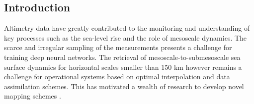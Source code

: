 \begin{bibunit}[IEEEtran.bst]



\section{Introduction}


  Altimetry data have greatly contributed to the monitoring and understanding of key processes such as the sea-level rise and the role of mesoscale dynamics.
    The scarce and irregular sampling of the measurements presents a challenge for training deep neural networks.
  The retrieval of mesoscale-to-submesoscale sea surface dynamics for horizontal scales smaller than 150 km however remains a challenge for operational systems based on optimal interpolation \cite{taburetDUACSDT2018252019} and data assimilation \cite{jean-michelCopernicusGlobal122021} schemes. This has motivated a wealth of research to develop novel mapping schemes \cite{ballarottaDynamicMappingAlongTrack2020,ubelmannReconstructingOceanSurface2021,guillouMappingAltimetryForthcoming2021}.


\end{bibunit}
